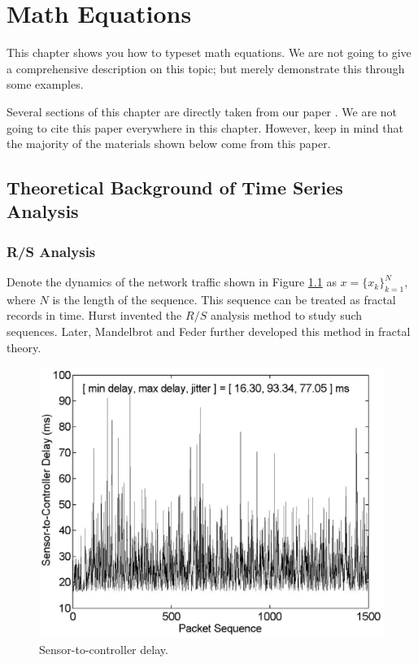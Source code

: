 
\chapter[Math Equations]{Math Equations}
\label{cha:cha3}

This chapter shows you how to typeset math equations. We are not going to give a comprehensive description on this topic; but merely demonstrate this through some examples. 

Several sections of this chapter are directly taken from our paper \citep{TianPLA07}. We are not going to cite this paper everywhere in this chapter. However, keep in mind that the majority of the materials shown below come from this paper. 



\section{Theoretical Background of Time Series Analysis}
\label{sec:theory}
\subsection{R/S Analysis}

Denote the dynamics of the network traffic shown in Figure
\ref{fig:DelayS} as $x=\{x_k\}_{k=1}^N$, where $N$ is the length
of the sequence. This sequence can be treated as fractal records
in time. Hurst invented the $R/S$ analysis method to study such
sequences. Later, Mandelbrot and
Feder further developed this method in fractal
theory.

\begin{figure}[htb!]
\begin{center}
	\includegraphics[scale=0.48]{./DelayS.eps}
\end{center}
	\caption[Sensor-to-controller delay]{Sensor-to-controller delay.}
	\label{fig:DelayS}
\end{figure}


